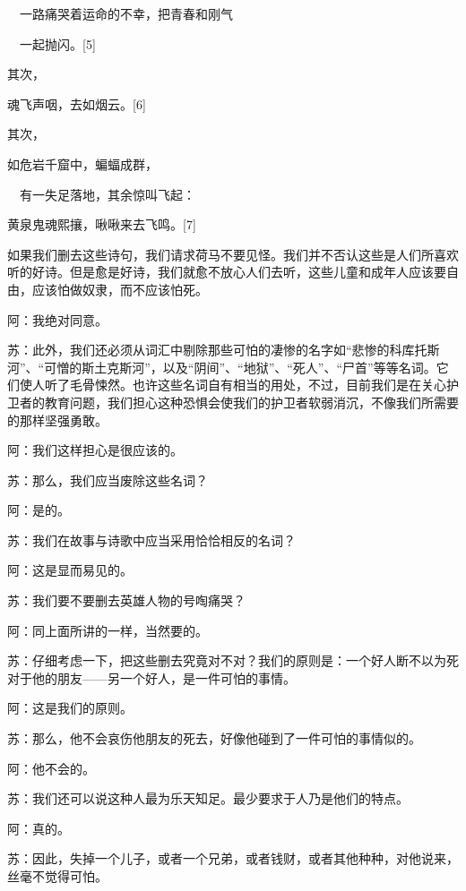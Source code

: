 \documentclass[12pt,oneside]{book}
\begin{document}
　一路痛哭着运命的不幸，把青春和刚气

　一起抛闪。[5]





其次，





魂飞声咽，去如烟云。[6]





其次，





如危岩千窟中，蝙蝠成群，

　有一失足落地，其余惊叫飞起：

黄泉鬼魂熙攘，啾啾来去飞鸣。[7]





如果我们删去这些诗句，我们请求荷马不要见怪。我们并不否认这些是人们所喜欢听的好诗。但是愈是好诗，我们就愈不放心人们去听，这些儿童和成年人应该要自由，应该怕做奴隶，而不应该怕死。

阿：我绝对同意。

苏：此外，我们还必须从词汇中剔除那些可怕的凄惨的名字如“悲惨的科库托斯河”、“可憎的斯土克斯河”，以及“阴间”、“地狱”、“死人”、“尸首”等等名词。它们使人听了毛骨悚然。也许这些名词自有相当的用处，不过，目前我们是在关心护卫者的教育问题，我们担心这种恐惧会使我们的护卫者软弱消沉，不像我们所需要的那样坚强勇敢。

阿：我们这样担心是很应该的。

苏：那么，我们应当废除这些名词？

阿：是的。

苏：我们在故事与诗歌中应当采用恰恰相反的名词？

阿：这是显而易见的。

苏：我们要不要删去英雄人物的号啕痛哭？

阿：同上面所讲的一样，当然要的。

苏：仔细考虑一下，把这些删去究竟对不对？我们的原则是：一个好人断不以为死对于他的朋友——另一个好人，是一件可怕的事情。

阿：这是我们的原则。

苏：那么，他不会哀伤他朋友的死去，好像他碰到了一件可怕的事情似的。

阿：他不会的。

苏：我们还可以说这种人最为乐天知足。最少要求于人乃是他们的特点。

阿：真的。

苏：因此，失掉一个儿子，或者一个兄弟，或者钱财，或者其他种种，对他说来，丝毫不觉得可怕。
\end{document}
